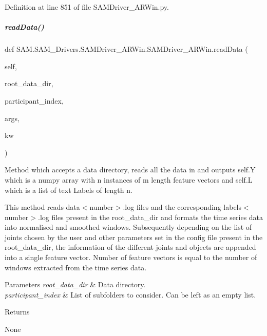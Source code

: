 Definition at line 851 of file S\+A\+M\+Driver\+\_\+\+A\+R\+Win.\+py.

\mbox{\label{group__icubclient__SAM__Drivers_afc5f853cfede70ba59eadee2277a9e6c}} 
\subparagraph{\texorpdfstring{read\+Data()}{readData()}}
{\footnotesize\ttfamily def S\+A\+M.\+S\+A\+M\+\_\+\+Drivers.\+S\+A\+M\+Driver\+\_\+\+A\+R\+Win.\+S\+A\+M\+Driver\+\_\+\+A\+R\+Win.\+read\+Data (\begin{DoxyParamCaption}\item[{}]{self,  }\item[{}]{root\+\_\+data\+\_\+dir,  }\item[{}]{participant\+\_\+index,  }\item[{}]{args,  }\item[{}]{kw }\end{DoxyParamCaption})}



Method which accepts a data directory, reads all the data in and outputs self.\+Y which is a numpy array with n instances of m length feature vectors and self.\+L which is a list of text Labels of length n. 

This method reads data$<$number$>$.\+log files and the corresponding labels$<$number$>$.\+log files present in the root\+\_\+data\+\_\+dir and formats the time series data into normalised and smoothed windows. Subsequently depending on the list of joints chosen by the user and other parameters set in the config file present in the root\+\_\+data\+\_\+dir, the information of the different joints and objects are appended into a single feature vector. Number of feature vectors is equal to the number of windows extracted from the time series data.


\begin{DoxyParams}{Parameters}
{\em root\+\_\+data\+\_\+dir} & Data directory. \\
\hline
{\em participant\+\_\+index} & List of subfolders to consider. Can be left as an empty list.\\
\hline
\end{DoxyParams}
\begin{DoxyReturn}{Returns}


None 
\end{DoxyReturn}


